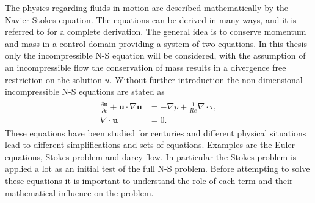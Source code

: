 The physics regarding fluids in motion are described mathematically by the Navier-Stokes equation. 
The equations can be derived in many ways, and it is referred to \cite{White} for a complete derivation.
The general idea is to conserve momentum and mass in a control domain providing a system of two equations.
In this thesis only the incompressible N-S equation will be considered, 
with the assumption of an incompressible flow the conservation of mass 
results in a divergence free restriction on the solution $u$.
Without further introduction the non-dimensional incompressible  N-S equations are stated as  
%
\begin{align}
    \begin{split}
    \frac{\partial \mathbf{u}}{\partial t} + \mathbf{u}\cdot \nabla\mathbf{u} &= -\nabla p + \frac{1}{Re}\nabla \cdot \tau, \\
		\nabla \cdot \mathbf{u} &= 0.
    \end{split}
	\label{eq:NS}
\end{align}
%
These equations have been studied for centuries and different physical situations
lead to different simplifications and sets of equations.
Examples are the Euler equations,
Stokes problem and darcy flow.
In particular the Stokes problem is applied a lot as an initial test of the full N-S problem. 
Before attempting to solve these equations it is important to understand the role of each term 
and their mathematical influence on the problem. 
